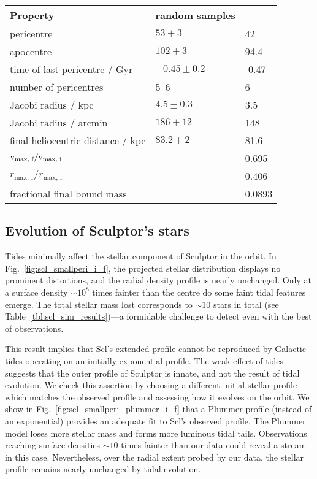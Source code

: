 \begin{table*}[t]
\centering
\caption[Simulation results for Sculptor’s dark matter]{The orbital and dark matter properties for the simulation of Sculptor. The random samples column shows the distributions from point orbits, and the \smallperi{} column contains the results from the N-body simulation. }
\label{tbl:scl_sim_results}
\begin{tabular}{lll}
\toprule
Property & random samples & \smallperi{}\\
\midrule
pericentre & $53\pm3$ & 42\\
apocentre & $102\pm3$ & 94.4\\
time of last pericentre / Gyr & $-0.45 \pm 0.2$ & -0.47\\
number of pericentres & 5–6 & 6\\
Jacobi radius / kpc & $4.5 \pm 0.3$ & 3.5\\
Jacobi radius / arcmin & $186\pm12$ & 148\\
final heliocentric distance / kpc & $83.2\pm2$ & 81.6\\
${\rm v}_\textrm{max, f} / {\rm v}_\textrm{max, i}$ &  & 0.695\\
$r_\textrm{max, f} / r_\textrm{max, i}$ &  & 0.406\\
fractional final bound mass &  & 0.0893\\
\bottomrule
\end{tabular}
\end{table*}

\subsection{Evolution of Sculptor's stars}\label{sec:scl_sim_stars}

Tides minimally affect the stellar component of Sculptor in the
\smallperi{} orbit. In Fig.~\ref{fig:scl_smallperi_i_f}, the projected
stellar distribution displays no prominent distortions, and the radial
density profile is nearly unchanged. Only at a surface density
\(\sim10^8\) times fainter than the centre do some faint tidal features
emerge. The total stellar mass lost corresponds to \(\sim 10\) stars in
total (see Table~\ref{tbl:scl_sim_results})---a formidable challenge to
detect even with the best of observations.

This result implies that Scl's extended profile cannot be reproduced by
Galactic tides operating on an initially exponential profile. The weak
effect of tides suggests that the outer profile of Sculptor is innate,
and not the result of tidal evolution. We check this assertion by
choosing a different initial stellar profile which matches the observed
profile and assessing how it evolves on the \smallperi{} orbit. We show
in Fig.~\ref{fig:scl_smallperi_plummer_i_f} that a Plummer profile
(instead of an exponential) provides an adequate fit to Scl's observed
profile. The Plummer model loses more stellar mass and forms more
luminous tidal tails. Observations reaching surface densities \(\sim10\)
times fainter than our data could reveal a stream in this case.
Nevertheless, over the radial extent probed by our data, the stellar
profile remains nearly unchanged by tidal evolution.

